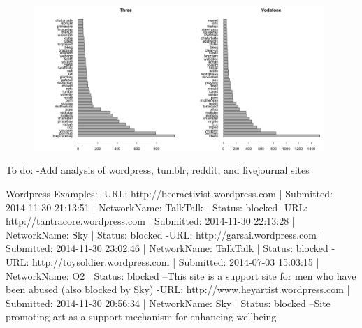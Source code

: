 \documentclass{bmcart}
\begin{document}
\begin{figure}[h!]
\includegraphics[width=0.49\textwidth]{imgs/Three-blocked-pages-to-date.png}\includegraphics[width=0.49\textwidth]{imgs/Vodafone-blocked-pages-to-date}
\label{fig:mobile-blocked-domains}
\end{figure}


To do:
-Add analysis of wordpress, tumblr, reddit, and livejournal sites

Wordpress Examples:
-URL: http://beeractivist.wordpress.com | Submitted: 2014-11-30 21:13:51 | NetworkName: TalkTalk | Status: blocked
-URL: http://tantracore.wordpress.com | Submitted: 2014-11-30 22:13:28 | NetworkName: Sky | Status: blocked
-URL: http://garsai.wordpress.com | Submitted: 2014-11-30 23:02:46 | NetworkName: TalkTalk | Status: blocked
-URL: http://toysoldier.wordpress.com | Submitted: 2014-07-03 15:03:15 | NetworkName: O2 | Status: blocked
--This site is a support site for men who have been abused (also blocked by Sky)
-URL: http://www.heyartist.wordpress.com | Submitted: 2014-11-30 20:56:34 | NetworkName: Sky | Status: blocked
--Site promoting art as a support mechanism for enhancing wellbeing
\end{document}
